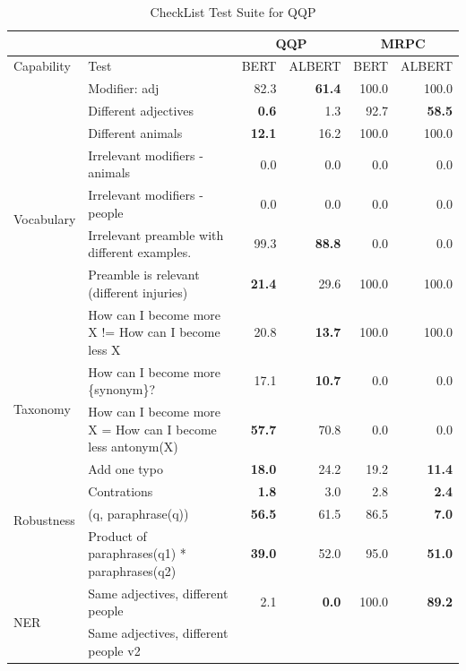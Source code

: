 \documentclass{article}
\begin{document}
\begin{table}[!htbp]
\begin{threeparttable}[b]
\caption{CheckList Test Suite for QQP}
\centering
\begin{tabular}{llrrrr}
\hline
 &
  \multicolumn{1}{r}{} &
  \multicolumn{2}{c}{QQP} &
  \multicolumn{2}{c}{MRPC} \\ \hline
Capability &
  Test &
  \multicolumn{1}{c}{BERT} &
  \multicolumn{1}{c}{ALBERT} &
  \multicolumn{1}{c}{BERT} &
  \multicolumn{1}{c}{ALBERT} \\ \hline
\multirow{8}{*}{Vocabulary} &
  Modifier: adj &
  82.3 &
  \textbf{61.4} &
  100.0 &
  100.0 \\
 &
  Different adjectives &
  \textbf{0.6} &
  1.3 &
  92.7 &
  \textbf{58.5} \\
 &
  Different animals &
  \textbf{12.1} &
  16.2 &
  100.0 &
  100.0 \\
 &
  Irrelevant modifiers - animals &
  0.0 &
  0.0 &
  0.0 &
  0.0 \\
 &
  Irrelevant modifiers - people &
  0.0 &
  0.0 &
  0.0 &
  0.0 \\
 &
  Irrelevant preamble with different examples. &
  99.3 &
  \textbf{88.8} &
  0.0 &
  0.0 \\
 &
  Preamble is relevant (different injuries) &
  \textbf{21.4} &
  29.6 &
  100.0 &
  100.0 \\
 &
  How can I become more X != How can I become less X &
  20.8 &
  \textbf{13.7} &
  100.0 &
  100.0 \\ \hline
\multirow{2}{*}{Taxonomy} &
  How can I become more \{synonym\}? &
  17.1 &
  \textbf{10.7} &
  0.0 &
  0.0 \\
 &
  How can I become more X = How can I become less antonym(X) &
  \textbf{57.7} &
  70.8 &
  0.0 &
  0.0 \\ \hline
\multirow{4}{*}{Robustness} &
  Add one typo &
  \textbf{18.0} &
  24.2 &
  19.2 &
  \textbf{11.4} \\
 &
  Contrations &
  \textbf{1.8} &
  3.0 &
  2.8 &
  \textbf{2.4} \\
 &
  (q, paraphrase(q)) &
  \textbf{56.5} &
  61.5 &
  86.5 &
  \textbf{7.0} \\
 &
  Product of paraphrases(q1) * paraphrases(q2) &
  \textbf{39.0} &
  52.0 &
  95.0 &
  \textbf{51.0} \\ \hline
\multirow{3}{*}{NER} &
  Same adjectives, different people &
  2.1 &
  \textbf{0.0} &
  100.0 &
  \textbf{89.2} \\
 &
  Same adjectives, different people v2 &

\end{tabular}
\end{threeparttable}
\end{table}
\end{document}
